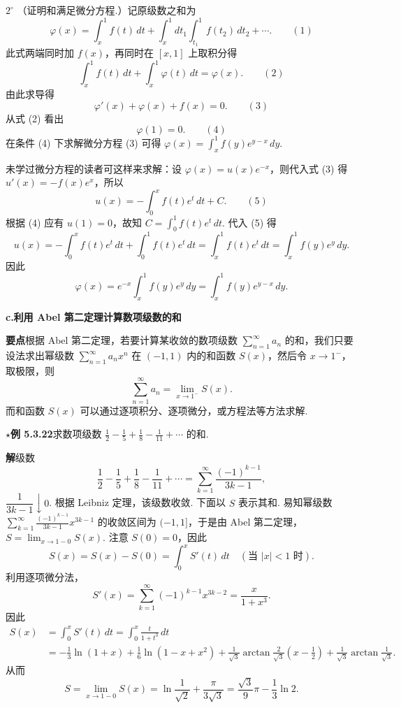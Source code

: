 \documentclass[UTF8,12pt,a4paper,fontset=fandol]{ctexart}
\begin{document}
$2^\circ$ （证明和满足微分方程.）记原级数之和为
\[
  \varphi(x)=\int_x^1 f(t)\,dt+\int_x^1dt_1\int_{t_1}^1 f(t_2)\,dt_2+\cdots. \qquad(1)
\]
此式两端同时加 $f(x)$，再同时在 $[x,1]$ 上取积分得
\[
  \int_x^1 f(t)\,dt+\int_x^1\varphi(t)\,dt=\varphi(x). \qquad(2)
\]
由此求导得
\[
  \varphi'(x)+\varphi(x)+f(x)=0. \qquad(3)
\]
从式 (2) 看出
\[
  \varphi(1)=0. \qquad(4)
\]
在条件 (4) 下求解微分方程 (3) 可得
$\displaystyle\varphi(x)=\int_x^1 f(y)e^{y-x}\,dy$.

未学过微分方程的读者可这样来求解：设 $\varphi(x)=u(x)e^{-x}$，则代入式 (3) 得
$u'(x)=-f(x)e^x$，所以
\[
  u(x)=-\int_0^x f(t)e^t\,dt+C. \qquad(5)
\]
根据 (4) 应有 $u(1)=0$，故知 $C=\displaystyle\int_0^1 f(t)e^t\,dt$. 代入 (5) 得
\[
  u(x)=-\int_0^x f(t)e^t\,dt+\int_0^1 f(t)e^t\,dt
  =\int_x^1 f(t)e^t\,dt=\int_x^1 f(y)e^y\,dy.
\]
因此
\[
  \varphi(x)=e^{-x}\int_x^1 f(y)e^y\,dy
  =\int_x^1 f(y)e^{y-x}\,dy.
\]

\noindent\textbf{c.\quad 利用 Abel 第二定理计算数项级数的和}

\noindent\textbf{要点}\quad 根据 Abel 第二定理，若要计算某收敛的数项级数
$\displaystyle\sum_{n=1}^{\infty}a_n$ 的和，我们只要设法求出幂级数
$\displaystyle\sum_{n=1}^{\infty}a_nx^n$ 在 $(-1,1)$ 内的和函数 $S(x)$，然后令 $x\to1^-$，取极限，则
\[
  \sum_{n=1}^{\infty}a_n=\lim_{x\to1^-}S(x).
\]
而和函数 $S(x)$ 可以通过逐项积分、逐项微分，或方程法等方法求解.

\noindent\(\star\)\textbf{例 5.3.22}\quad 求数项级数
$\displaystyle\frac12-\frac15+\frac18-\frac1{11}+\cdots$ 的和.

\noindent\textbf{解}\quad 级数
\[
  \frac12-\frac15+\frac18-\frac1{11}+\cdots
  =\sum_{k=1}^{\infty}\frac{(-1)^{k-1}}{3k-1},
\]
$\dfrac1{3k-1}\downarrow0$. 根据 Leibniz 定理，该级数收敛. 下面以 $S$ 表示其和. 易知幂级数
$\displaystyle\sum_{k=1}^{\infty}\frac{(-1)^{k-1}}{3k-1}x^{3k-1}$ 的收敛区间为 $(-1,1]$，于是由 Abel 第二定理，
$S=\displaystyle\lim_{x\to1-0}S(x)$. 注意 $S(0)=0$，因此
\[
  S(x)=S(x)-S(0)=\int_0^x S'(t)\,dt\quad(\text{当 }|x|<1\text{ 时}).
\]
利用逐项微分法，
\[
  S'(x)=\sum_{k=1}^{\infty}(-1)^{k-1}x^{3k-2}=\frac{x}{1+x^3}.
\]
因此
\[
\begin{aligned}
S(x)
&=\int_0^x S'(t)\,dt=\int_0^x\frac{t}{1+t^3}\,dt\\
&=-\frac13\ln(1+x)+\frac16\ln(1-x+x^2)
+\frac1{\sqrt3}\arctan\frac2{\sqrt3}\left(x-\frac12\right)
+\frac1{\sqrt3}\arctan\frac1{\sqrt3}.
\end{aligned}
\]
从而
\[
  S=\lim_{x\to1-0}S(x)=\ln\frac1{\sqrt2}+\frac{\pi}{3\sqrt3}
  =\frac{\sqrt3}{9}\pi-\frac13\ln2.
\]
\end{document}
